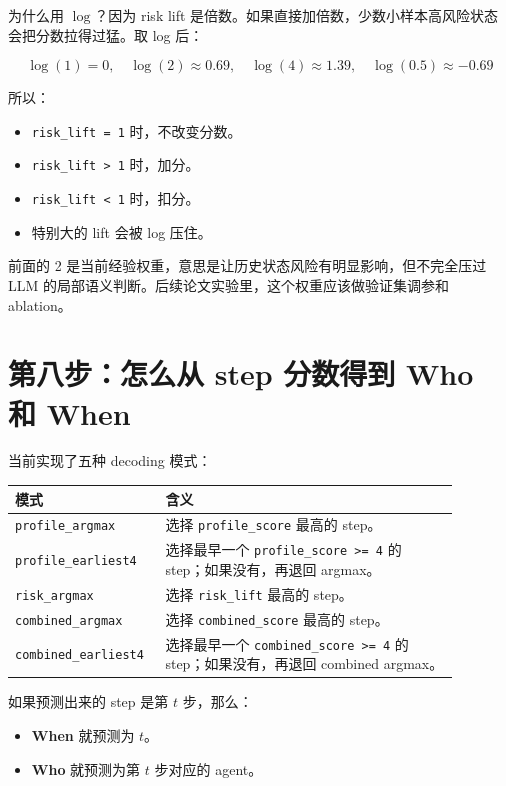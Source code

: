 \documentclass[UTF8,a4paper,11pt]{ctexart}
\begin{document}
为什么用 \(\log\)？因为 risk lift 是倍数。如果直接加倍数，少数小样本高风险状态会把分数拉得过猛。取 log 后：

\[
\log(1)=0,\quad
\log(2)\approx 0.69,\quad
\log(4)\approx 1.39,\quad
\log(0.5)\approx -0.69
\]

所以：

\begin{itemize}
  \item \texttt{risk\_lift = 1} 时，不改变分数。
  \item \texttt{risk\_lift > 1} 时，加分。
  \item \texttt{risk\_lift < 1} 时，扣分。
  \item 特别大的 lift 会被 log 压住。
\end{itemize}

前面的 2 是当前经验权重，意思是让历史状态风险有明显影响，但不完全压过 LLM 的局部语义判断。后续论文实验里，这个权重应该做验证集调参和 ablation。

\section{第八步：怎么从 step 分数得到 Who 和 When}

当前实现了五种 decoding 模式：

\begin{longtable}{p{0.26\linewidth}p{0.62\linewidth}}
\toprule
模式 & 含义 \\
\midrule
\endhead
\texttt{profile\_argmax} & 选择 \texttt{profile\_score} 最高的 step。 \\
\texttt{profile\_earliest4} & 选择最早一个 \texttt{profile\_score >= 4} 的 step；如果没有，再退回 argmax。 \\
\texttt{risk\_argmax} & 选择 \texttt{risk\_lift} 最高的 step。 \\
\texttt{combined\_argmax} & 选择 \texttt{combined\_score} 最高的 step。 \\
\texttt{combined\_earliest4} & 选择最早一个 \texttt{combined\_score >= 4} 的 step；如果没有，再退回 combined argmax。 \\
\bottomrule
\end{longtable}

如果预测出来的 step 是第 $t$ 步，那么：

\begin{itemize}
  \item \textbf{When} 就预测为 $t$。
  \item \textbf{Who} 就预测为第 $t$ 步对应的 agent。
\end{itemize}
\end{document}
